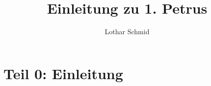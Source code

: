 \documentclass[fontsize=16pt]{mybib}
\title{Einleitung zu 1. Petrus}
\author{Lothar Schmid}
\date{}
\begin{document}
\mytitlepage
\tableofcontents
\newpage

\section{Teil 0: Einleitung}
\end{document}
